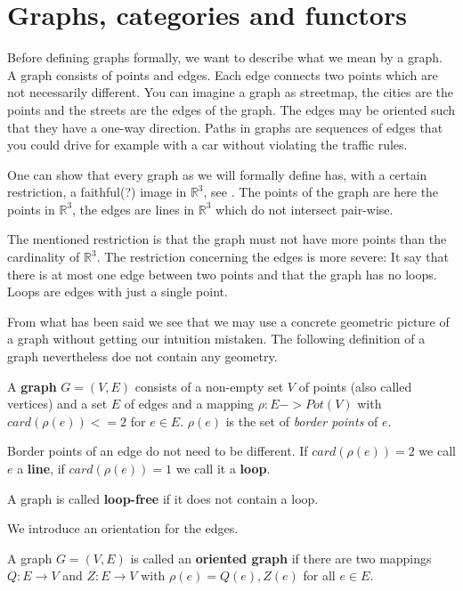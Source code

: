 \section{Graphs, categories and functors}

Before defining graphs formally, we want to describe what we mean by a graph. A
graph consists of points and edges. Each edge connects two points which are not
necessarily different. You can imagine a graph as streetmap, the cities are the
points and the streets are the edges of the graph. The edges may be oriented
such that they have a one-way direction. Paths in graphs are sequences of edges
that you could drive for example with a car without violating the traffic rules.

One can show that every graph as we will formally define has, with a certain
restriction, a faithful(?) image in $\mathbb{R}^3$, see \cite{Wagner}. The
points of the graph are here the points in $\mathbb{R}^3$, the edges are lines
in $\mathbb{R}^3$ which do not intersect pair-wise.

The mentioned restriction is that the graph must not have more points than the
cardinality of $\mathbb{R}^3$. The restriction concerning the edges is more
severe: It say that there is at most one edge between two points and that the
graph has no loops. Loops are edges with just a single point.

From what has been said we see that we may use a concrete geometric picture of
a graph without getting our intuition mistaken. The following definition of a
graph nevertheless doe not contain any geometry.

\begin{definition}[graph]
A {\bf graph} $G = (V, E)$ consists of a non-empty set $V$ of points (also
called vertices) and a set $E$ of edges and a mapping $\rho: E -> Pot(V)$ with
$card(\rho(e)) <= 2$ for $e \in E$. $\rho(e)$ is the set of {\em border points}
of $e$.
\end{definition}

Border points of an edge do not need to be different. If $card(\rho(e)) = 2$ we
call $e$ a {\bf line}, if $card(\rho(e)) = 1$ we call it a {\bf loop}.

\begin{definition}
A graph is called {\bf loop-free} if it does not contain a loop.
\end{definition}

We introduce an orientation for the edges. 

\begin{definition}
A graph $G = (V,E)$ is called an {\bf oriented graph} if there are two mappings
$Q : E \to V$ and $Z : E \to V$ with $\rho(e) = {Q(e), Z(e)}$ for all $e \in E$.
\end{definition}

